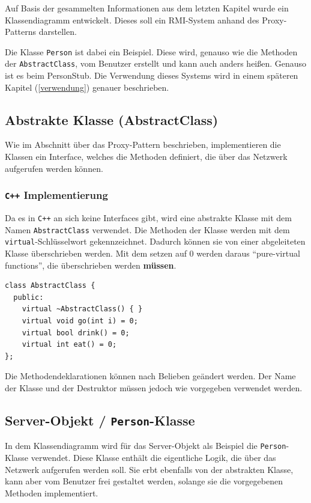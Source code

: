 \documentclass[a4paper,oneside,10pt]{report}
\begin{document}
Auf Basis der gesammelten Informationen aus dem letzten Kapitel wurde ein Klassendiagramm entwickelt. Dieses soll ein RMI-System anhand des Proxy-Patterns darstellen.

Die Klasse \texttt{Person} ist dabei ein Beispiel. Diese wird, genauso wie die Methoden der \texttt{AbstractClass}, vom Benutzer erstellt und kann auch anders heißen. Genauso ist es beim PersonStub. Die Verwendung dieses Systems wird in einem späteren Kapitel (\ref{verwendung}) genauer beschrieben. 


\subsection{Abstrakte Klasse (AbstractClass)}

Wie im Abschnitt über das Proxy-Pattern beschrieben, implementieren die Klassen ein Interface, welches die Methoden definiert, die über das Netzwerk aufgerufen werden können. 

\subsubsection{\texttt{C++} Implementierung} \label{abstractClass}

Da es in \texttt{C++} an sich keine Interfaces gibt, wird eine abstrakte Klasse mit dem Namen \texttt{AbstractClass} verwendet. Die Methoden der Klasse werden mit dem \texttt{virtual}-Schlüsselwort gekennzeichnet. Dadurch können sie von einer abgeleiteten Klasse überschrieben werden. Mit dem setzen auf 0 werden daraus "`pure-virtual functions"', die überschrieben werden \textbf{müssen}.
\begin{lstlisting} 
class AbstractClass {
  public:
	virtual ~AbstractClass() { }
	virtual void go(int i) = 0;
	virtual bool drink() = 0;
	virtual int eat() = 0;
};
\end{lstlisting}

Die Methodendeklarationen können nach Belieben geändert werden. Der Name der Klasse und der Destruktor müssen jedoch wie vorgegeben verwendet werden.

\subsection{Server-Objekt / \texttt{Person}-Klasse}

In dem Klassendiagramm wird für das Server-Objekt als Beispiel die \texttt{Person}-Klasse verwendet. Diese Klasse enthält die eigentliche Logik, die über das Netzwerk aufgerufen werden soll. Sie erbt ebenfalls von der abstrakten Klasse, kann aber vom Benutzer frei gestaltet werden, solange sie die vorgegebenen Methoden implementiert. 
\end{document}

